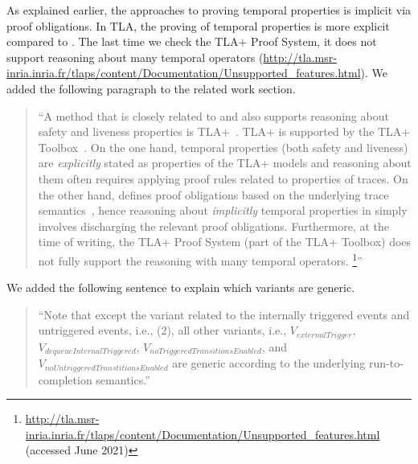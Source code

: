 \documentclass{response}
\begin{document}
\begin{response}
  As explained earlier, the \EventB approaches to proving temporal
  properties is implicit via proof obligations. In TLA, the proving of
  temporal properties is more explicit compared to \EventB. The last
  time we check the TLA+ Proof System, it does not support reasoning
  about many temporal operators
  (\url{http://tla.msr-inria.inria.fr/tlaps/content/Documentation/Unsupported_features.html}).
  We added the following paragraph to the related work section.
\begin{quote}
    ``A method that is closely related to \mbox{\EventB} and also supports
  reasoning about safety and liveness properties is
  TLA+~\mbox{\cite{DBLP:books/aw/Lamport2002}}. TLA+ is supported by
  the TLA+ Toolbox~\mbox{\cite{DBLP:journals/corr/abs-1912-10633}}.
  On the one hand, temporal properties (both safety and liveness) are
  \emph{explicitly} stated as properties of the TLA+ models and
  reasoning about them often requires applying proof rules related to
  properties of traces. On the other hand, \mbox{\EventB} defines
  proof obligations based on the underlying trace
  semantics~\mbox{\cite{abrial10:_model_event_b,hoang2016ltl,hudon16:_unit_b_method}},
  hence reasoning about \emph{implicitly} temporal properties in
  \mbox{\EventB} simply involves discharging the relevant proof
  obligations. Furthermore, at the time of writing, the TLA+ Proof
  System (part of the TLA+ Toolbox) does not fully support the
  reasoning with many temporal operators.%
\footnote{\url{http://tla.msr-inria.inria.fr/tlaps/content/Documentation/Unsupported_features.html}
  (accessed June 2021)}''
  \end{quote}
\end{response}


\begin{comment}{Reviewer \#1}
• It would be interesting to analyze if the proofs are specific to the ex-
ample or to the underlying semantics?
\end{comment}

\begin{response}
  We added the following sentence to explain which variants are
  generic.
  \begin{quote}
    ``Note that except the variant related to the internally
    triggered events and untriggered events, i.e., (2), all other
    variants, i.e., $V_{externalTrigger}$,
    $V_{dequeueInternalTriggered}$,
    $V_{noTriggeredTransitionsEnabled}$, and
    $V_{noUntriggeredTranstitionsEnabled}$ are generic according to
    the underlying run-to-completion semantics.''
  \end{quote}
\end{response}
 
\end{document}
